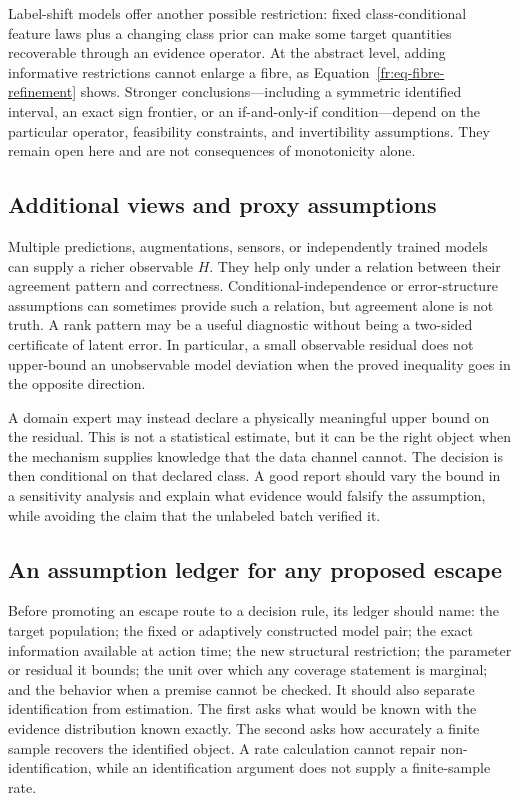 Label-shift models offer another possible restriction: fixed class-conditional feature laws plus a
changing class prior can make some target quantities recoverable through an evidence operator.  At
the abstract level, adding informative restrictions cannot enlarge a fibre, as
Equation~\eqref{fr:eq-fibre-refinement} shows.  Stronger conclusions---including a symmetric
identified interval, an exact sign frontier, or an if-and-only-if condition---depend on the
particular operator, feasibility constraints, and invertibility assumptions.  They remain open here
and are not consequences of monotonicity alone.

\subsection{Additional views and proxy assumptions}
\label{fr:subsec-additional-views}

Multiple predictions, augmentations, sensors, or independently trained models can supply a richer
observable $H$.  They help only under a relation between their agreement pattern and correctness.
Conditional-independence or error-structure assumptions can sometimes provide such a relation, but
agreement alone is not truth.  A rank pattern may be a useful diagnostic without being a two-sided
certificate of latent error.  In particular, a small observable residual does not upper-bound an
unobservable model deviation when the proved inequality goes in the opposite direction.

A domain expert may instead declare a physically meaningful upper bound on the residual.  This is
not a statistical estimate, but it can be the right object when the mechanism supplies knowledge
that the data channel cannot.  The decision is then conditional on that declared class.  A good
report should vary the bound in a sensitivity analysis and explain what evidence would falsify the
assumption, while avoiding the claim that the unlabeled batch verified it.

\subsection{An assumption ledger for any proposed escape}
\label{fr:subsec-assumption-ledger}

Before promoting an escape route to a decision rule, its ledger should name: the target population;
the fixed or adaptively constructed model pair; the exact information available at action time; the
new structural restriction; the parameter or residual it bounds; the unit over which any coverage
statement is marginal; and the behavior when a premise cannot be checked.  It should also separate
identification from estimation.  The first asks what would be known with the evidence distribution
known exactly.  The second asks how accurately a finite sample recovers the identified object.  A
rate calculation cannot repair non-identification, while an identification argument does not supply
a finite-sample rate.

